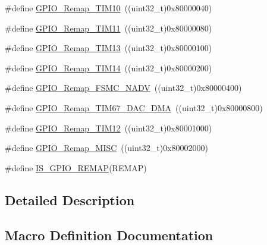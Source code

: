 \begin{DoxyCompactItemize}
\#define \hyperlink{group___g_p_i_o___remap__define_gac94252266a8fcb9ce7b55b5c55464110}{G\+P\+I\+O\+\_\+\+Remap\+\_\+\+T\+I\+M10}~((uint32\+\_\+t)0x80000040)
\item 
\#define \hyperlink{group___g_p_i_o___remap__define_ga0f308f1bb45e4c473766603b4bef47f8}{G\+P\+I\+O\+\_\+\+Remap\+\_\+\+T\+I\+M11}~((uint32\+\_\+t)0x80000080)
\item 
\#define \hyperlink{group___g_p_i_o___remap__define_ga72f5da86ed94f3be978cd841f7cd37cb}{G\+P\+I\+O\+\_\+\+Remap\+\_\+\+T\+I\+M13}~((uint32\+\_\+t)0x80000100)
\item 
\#define \hyperlink{group___g_p_i_o___remap__define_gaa2ae554ed69ad3368c2cd7db678b3fd0}{G\+P\+I\+O\+\_\+\+Remap\+\_\+\+T\+I\+M14}~((uint32\+\_\+t)0x80000200)
\item 
\#define \hyperlink{group___g_p_i_o___remap__define_ga97088efda8b8a057f4ba58de8f51625f}{G\+P\+I\+O\+\_\+\+Remap\+\_\+\+F\+S\+M\+C\+\_\+\+N\+A\+DV}~((uint32\+\_\+t)0x80000400)
\item 
\#define \hyperlink{group___g_p_i_o___remap__define_gae69d46a269c2284c8cc6a90742e89b12}{G\+P\+I\+O\+\_\+\+Remap\+\_\+\+T\+I\+M67\+\_\+\+D\+A\+C\+\_\+\+D\+MA}~((uint32\+\_\+t)0x80000800)
\item 
\#define \hyperlink{group___g_p_i_o___remap__define_ga44d3d86a684f62f9142d34ea5975a637}{G\+P\+I\+O\+\_\+\+Remap\+\_\+\+T\+I\+M12}~((uint32\+\_\+t)0x80001000)
\item 
\#define \hyperlink{group___g_p_i_o___remap__define_ga543f3626303b3452528cb622ad088d26}{G\+P\+I\+O\+\_\+\+Remap\+\_\+\+M\+I\+SC}~((uint32\+\_\+t)0x80002000)
\item 
\#define \hyperlink{group___g_p_i_o___remap__define_gaccf4664689f281fd4ee91ef16c9dc985}{I\+S\+\_\+\+G\+P\+I\+O\+\_\+\+R\+E\+M\+AP}(R\+E\+M\+AP)
\end{DoxyCompactItemize}


\subsection{Detailed Description}


\subsection{Macro Definition Documentation}
\mbox{\label{group___g_p_i_o___remap__define_gaf1f2d5cbc2281b3e3a6cc51c3fe7f77f}} 
